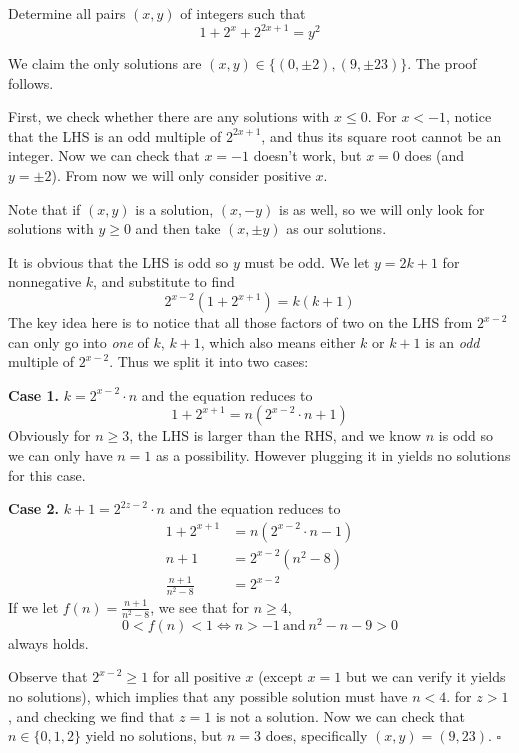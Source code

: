 
\begin{problem}[ISL 2006 N1]
    Determine all pairs $(x, y)$ of integers such that
    \[1+2^x+2^{2x+1}= y^2\]
\end{problem}

\begin{solution}[Ritwin]
    We claim the only solutions are $(x, y) \in \{(0, \pm2), (9, \pm23)\}$. The proof follows.
    
    First, we check whether there are any solutions with $x \leq 0$. For $x<-1$,
    notice that the LHS is an odd multiple of $2^{2x+1}$, and thus its square
    root cannot be an integer. Now we can check that $x=-1$ doesn't work, but
    $x=0$ does (and $y=\pm2$). From now we will only consider positive $x$.
    
    Note that if $(x, y)$ is a solution, $(x, -y)$ is as well, so we will only
    look for solutions with $y \geq 0$ and then take $(x, \pm y)$ as our solutions.
    
    It is obvious that the LHS is odd so $y$ must be odd. We let $y = 2k+1$ for
    nonnegative $k$, and substitute to find \[2^{x-2}(1 + 2^{x+1}) = k(k+1)\]
    The key idea here is to notice that all those factors of two on the LHS from
    $2^{x-2}$ can only go into \textit{one} of $k$, $k+1$, which also means
    either $k$ or $k+1$ is an \textit{odd} multiple of $2^{x-2}$. Thus we split
    it into two cases:
    
    \textbf{Case 1.} $k = 2^{x-2} \cdot n$ and the equation reduces to
    \[1 + 2^{x+1} = n(2^{x-2} \cdot n + 1)\]
    Obviously for $n \geq 3$, the LHS is larger than the RHS, and we know $n$
    is odd so we can only have $n=1$ as a possibility. However plugging it in
    yields no solutions for this case.
    
    \textbf{Case 2.} $k+1 = 2^{2z-2} \cdot n$ and the equation reduces to \begin{align*}
        1 + 2^{x+1} &= n(2^{x-2} \cdot n - 1)\\
        n+1 &= 2^{x-2}(n^2-8)\\
        \frac{n+1}{n^2-8} &= 2^{x-2}
    \end{align*}
    If we let $f(n) = \frac{n+1}{n^2-8}$, we see that for $n \geq 4$,
    \[0 < f(n) < 1 \Longleftrightarrow n > -1\mathrm{~and~}n^2-n-9 > 0\]
    always holds.
    
    Observe that $2^{x-2} \geq 1$ for all positive $x$ (except $x=1$ but we can
    verify it yields no solutions), which implies that any possible solution
    must have $n < 4$. for $z > 1$, and checking we find that $z=1$ is not a
    solution. Now we can check that $n \in \{0, 1, 2\}$ yield no solutions, but
    $n = 3$ does, specifically $(x, y) = (9, 23)$. $\square$
\end{solution}
